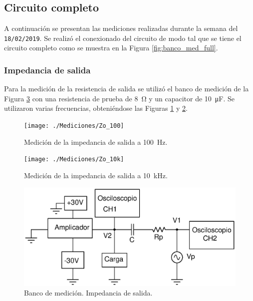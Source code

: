 
	\subsection{Circuito completo}
		A continuación se presentan las mediciones realizadas durante la semana del \texttt{18/02/2019}. Se realizó el conexionado del circuito de modo tal que se tiene el circuito completo como se muestra en la Figura \ref{fig:banco_med_full}. 



%
%
		\subsubsection{Impedancia de salida}

		Para la medición de la resistencia de salida se utilizó el banco de medición de la Figura \ref{fig:bco_zo} con una resistencia de prueba de \SI{8}{\ohm} y un capacitor de \SI{10}{\micro\farad}. Se utilizaron varias frecuencias, obteniéndose las Figuras \ref{fig:zo_100} y \ref{fig:zo_10k}.

		\begin{figure}[h!]
			\centering
			\texttt{[image: ./Mediciones/Zo\_100]}
			\caption{Medición de la impedancia de salida a \SI{100}{\Hz}.}
			\label{fig:zo_100}
		\end{figure}
		\begin{figure}[h!]
			\centering
			\texttt{[image: ./Mediciones/Zo\_10k]}
			\caption{Medición de la impedancia de salida a \SI{10}{\kHz}.}
			\label{fig:zo_10k}
		\end{figure}


\begin{figure}[H]
	\centering
	\includegraphics[scale=0.5]{./Figuras/bco_zo_salida.eps}
	\caption{Banco de medición. Impedancia de salida.}
	\label{fig:bco_zo}
\end{figure}

